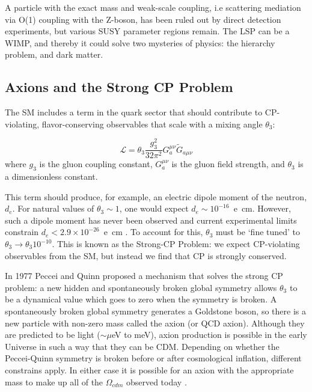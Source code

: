 A particle with the exact mass and weak-scale coupling, i.e scattering mediation via O(1) coupling with the Z-boson, has been ruled out by direct detection experiments, but various \ac{SUSY} parameter regions remain. The \ac{LSP} can be a \ac{WIMP}, and thereby it could solve two mysteries of physics: the hierarchy problem, and dark matter. 

\subsection{Axions and the Strong CP Problem}
\label{sec:axion}
The \ac{SM} includes a term in the quark sector that should contribute to CP-violating, flavor-conserving observables that scale with a mixing angle $\theta_{3}$:

\begin{equation}
\mathcal{L} = \theta_{3} \frac{g_{3}^{2}}{32 \pi^{2}} G^{\mu \nu}_{a} \tilde{G}_{a \mu \nu}
\end{equation}
where $g_{3}$ is the gluon coupling constant, $G^{\mu \nu}_{a}$ is the gluon field strength, and $\theta_{3}$ is a dimensionless constant.

This term should produce, for example, an electric dipole moment of the neutron, $d_{e}$. For natural values of $\theta_{3} \sim 1$,  one would expect $d_{e} \sim10^{-16}$~e~cm. However, such a dipole moment has never been observed and current experimental limits constrain $d_{e} < 2.9 \times 10^{-26}$~e~cm \cite{Feng2010}. To account for this, $\theta_{3}$ must be `fine tuned' to $\theta_{3} \longrightarrow \theta_{3}10^{-10}$. This is known as the Strong-CP Problem: we expect CP-violating observables from the \ac{SM}, but instead we find that CP is strongly conserved.

In 1977 Peccei and Quinn proposed a mechanism that solves the strong CP problem: a new hidden and spontaneously broken global symmetry allows $\theta_{3}$ to be a dynamical value which goes to zero when the symmetry is broken. A spontaneously broken global symmetry generates a Goldstone boson, so there is a new particle with non-zero mass called the axion (or QCD axion). Although they are predicted to be light ($\sim \mu$eV to meV), axion production is possible in the early Universe in such a way that they can be \ac{CDM}. Depending on whether the Peccei-Quinn symmetry is broken before or after cosmological inflation, different constrains apply. In either case it is possible for an axion with the appropriate mass to make up all of the $\Omega_{cdm}$ observed today \cite{PDGAxions2017}.



